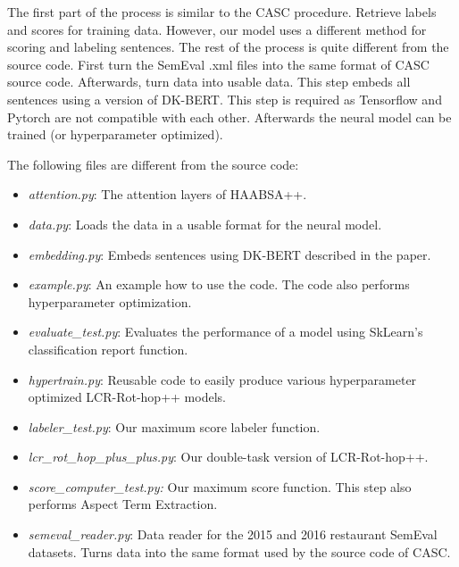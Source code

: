 \documentclass[american, oneside]{ecsgdp}
\begin{document}
The first part of the process is similar to the CASC procedure. Retrieve labels and scores for training data. However, our model uses a different method for scoring and labeling sentences. The rest of the process is quite different from the source code. First turn the SemEval .xml files into the same format of CASC source code. Afterwards, turn data into usable data. This step embeds all sentences using a version of DK-BERT. This step is required as Tensorflow and Pytorch are not compatible with each other. Afterwards the neural model can be trained (or hyperparameter optimized).

The following files are different from the source code:
\begin{itemize}
    \item \textit{attention.py}: The attention layers of HAABSA++.
    \item \textit{data.py}: Loads the data in a usable format for the neural model.
    \item \textit{embedding.py}: Embeds sentences using DK-BERT described in the paper. 
    \item \textit{example.py}: An example how to use the code. The code also performs hyperparameter optimization.
    \item \textit{evaluate\_test.py}: Evaluates the performance of a model using SkLearn's classification report function.
    \item \textit{hypertrain.py}: Reusable code to easily produce various hyperparameter optimized LCR-Rot-hop++ models.
    \item \textit{labeler\_test.py}: Our maximum score labeler function.
    \item \textit{lcr\_rot\_hop\_plus\_plus.py}: Our double-task version of LCR-Rot-hop++.
    \item \textit{score\_computer\_test.py:} Our maximum score function. This step also performs Aspect Term Extraction.
    \item \textit{semeval\_reader.py}: Data reader for the 2015 and 2016 restaurant SemEval datasets. Turns data into the same format used by the source code of CASC.
\end{itemize}
\end{document}
